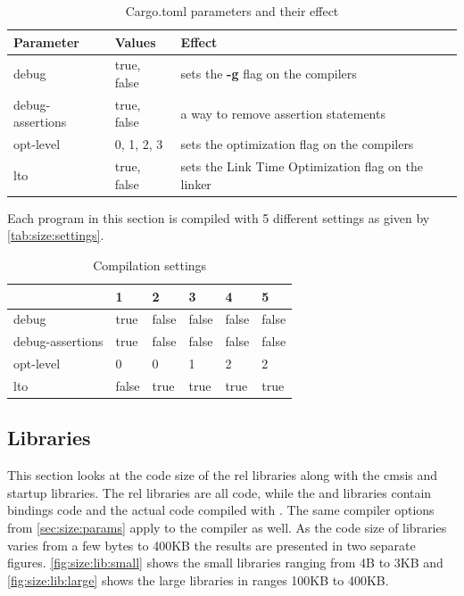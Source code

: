 \begin{table}[H]
  \centering
  \begin{tabular}{|l|l|l|}
    \hline
    Parameter & Values & Effect \\
    \hline
    debug & true, false & sets the \textbf{-g} flag on the compilers  \\
    debug-assertions & true, false & a way to remove assertion statements \\
    opt-level & 0, 1, 2, 3 & sets the optimization flag on the compilers \\
    lto & true, false & sets the Link Time Optimization flag on the linker \\
    \hline
  \end{tabular}
  \caption{Cargo.toml parameters and their effect}
  \label{tab:size:params}
\end{table}

Each program in this section is compiled with 5 different settings as given by \autoref{tab:size:settings}.
\begin{table}[H]
  \centering
  \begin{tabular}{|l|l|l|l|l|l|}
    \hline
    & 1     & 2     & 3     & 4     & 5     \\
    \hline
    debug            & true  & false & false & false & false \\
    debug-assertions & true  & false & false & false & false \\
    opt-level        & 0     & 0     & 1     & 2     & 2     \\
    lto              & false & true  & true  & true  & true  \\
    \hline
  \end{tabular}
  \caption{Compilation settings}
  \label{tab:size:settings}
\end{table}

\subsection{Libraries}

This section looks at the code size of the \gls{rel} libraries along with the cmsis and startup libraries.
The \gls{rel} libraries are all {\rust} code, while the  and  libraries contain bindings {\C} code and the actual {\C} code compiled with .
The same compiler options from \autoref{sec:size:params} apply to the {\C} compiler as well.
As the code size of libraries varies from a few bytes to 400KB the results are presented in two separate figures.
\autoref{fig:size:lib:small} shows the small libraries ranging from 4B to 3KB and \autoref{fig:size:lib:large} shows the large libraries in ranges 100KB to 400KB.


